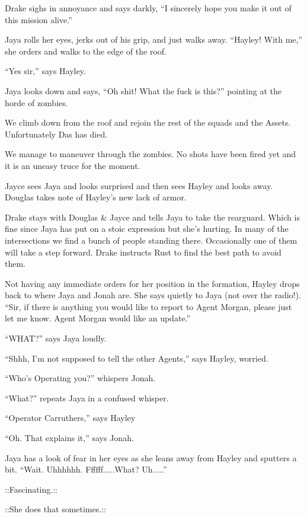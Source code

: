 Drake sighs in annoyance and says darkly,  ``I sincerely hope you make it out of this mission alive.''

Jaya rolls her eyes, jerks out of his grip, and just walks away.  ``Hayley!  With me,'' she orders and walks to the edge of the roof.

``Yes sir,'' says Hayley.

Jaya looks down and says, ``Oh shit!  What the fuck is this?'' pointing at the horde of zombies.



We climb down from the roof and rejoin the rest of the squads and the Assets.  Unfortunately Das has died.

We manage to maneuver through the zombies.  No shots have been fired yet and it is an uneasy truce for the moment.

Jayce sees Jaya and looks surprised and then sees Hayley and looks away.  Douglas takes note of Hayley's new lack of armor.



Drake stays with Douglas \& Jayce and tells Jaya to take the rearguard.  Which is fine since Jaya has put on a stoic expression but she's hurting.  In many of the intersections we find a bunch of people standing there.   Occasionally one of them will take a step forward.  Drake instructs Rust to find the best path to avoid them.

Not having any immediate orders for her position in the formation, Hayley drops back to where Jaya and Jonah are.  She says quietly to Jaya (not over the radio!).  ``Sir, if there is anything you would like to report to Agent Morgan, please just let me know.  Agent Morgan would like an update.''

``WHAT?'' says Jaya loudly.

``Shhh, I'm not supposed to tell the other Agents,'' says Hayley, worried.

``Who's Operating you?'' whispers Jonah.

``What?'' repeats Jaya in a confused whisper.

``Operator Carruthers,'' says Hayley

``Oh.  That explains it,'' says Jonah.

Jaya has a look of fear in her eyes as she leans away from Hayley and sputters a bit. ``Wait.  Uhhhhhh.  Ffffff.....What?  Uh.....''

 {\color[RGB]{153,0,255}::Fascinating.:: } 

 {\color[RGB]{230,145,56}::She does that sometimes.::}  {\color[RGB]{255,153,0} } 

